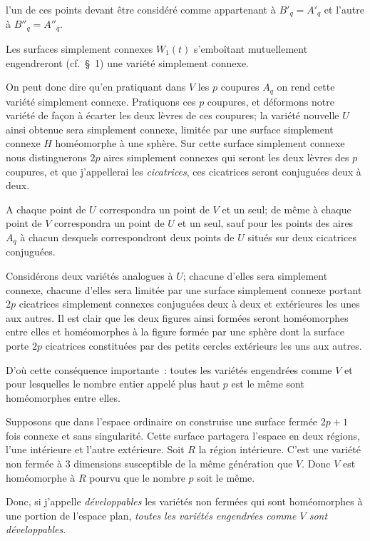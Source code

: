 \documentclass{article}
\begin{document}
l'un de ces points devant être considéré comme appartenant à $B'_{q} = A'_{q}$ et l'autre à $B''_{q} = A''_{q}$.

Les surfaces simplement connexes $W_{1}(t)$ s'emboîtant mutuellement engendreront (cf.\ \S~1) une variété simplement connexe.

On peut donc dire qu'en pratiquant dans $V$ les $p$ coupures $A_{q}$ on rend cette variété simplement connexe. Pratiquons ces $p$ coupures, et déformons notre variété de façon à écarter les deux lèvres de ces coupures; la variété nouvelle $U$ ainsi obtenue sera simplement connexe, limitée par une surface simplement connexe $H$ homéomorphe à une sphère. Sur cette surface simplement connexe nous distinguerons $2p$ aires simplement connexes qui seront les deux lèvres des $p$ coupures, et que j'appellerai les \emph{cicatrices}, ces cicatrices seront conjuguées deux à deux.

A chaque point de $U$ correspondra un point de $V$ et un seul; de même à chaque point de $V$ correspondra un point de $U$ et un seul, sauf pour les points des aires $A_{q}$ à chacun desquels correspondront deux points de $U$ situés sur deux cicatrices conjuguées.

Considérons deux variétés analogues à $U$; chacune d'elles sera simplement connexe, chacune d'elles sera limitée par une surface simplement connexe portant $2p$ cicatrices simplement connexes conjuguées deux à deux et extérieures les unes aux autres. Il est clair que les deux figures ainsi formées seront homéomorphes entre elles et homéomorphes à la figure formée par une sphère dont la surface porte $2p$ cicatrices constituées par des petits cercles extérieurs les uns aux autres.

D'où cette conséquence importante~: toutes les variétés engendrées comme $V$ et pour lesquelles le nombre entier appelé plus haut $p$ est le même sont homéomorphes entre elles.

Supposons que dans l'espace ordinaire on construise une surface fermée $2p + 1$ fois connexe et sans singularité. Cette surface partagera l'espace en deux régions, l'une intérieure et l'autre extérieure. Soit $R$ la région intérieure. C'est une variété non fermée à 3 dimensions susceptible de la même génération que $V$. Donc $V$ est homéomorphe à $R$ pourvu que le nombre $p$ soit le même.

Donc, si j'appelle \emph{développables} les variétés non fermées qui sont homéomorphes à une portion de l'espace plan, \emph{toutes les variétés engendrées comme $V$ sont développables}.
\end{document}

